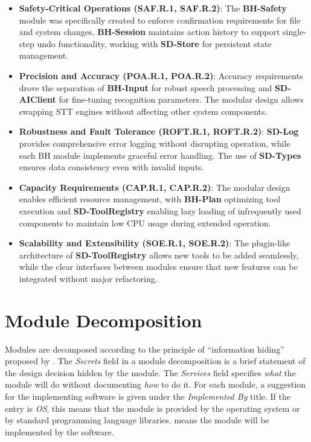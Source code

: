 \documentclass[12pt, titlepage]{article}
\begin{document}
\begin{itemize}
    \item \textbf{Safety-Critical Operations (SAF.R.1, SAF.R.2)}: The
    \textbf{BH-Safety} module was specifically created to enforce confirmation
    requirements for file and system changes. \textbf{BH-Session} maintains
    action history to support single-step undo functionality, working with
    \textbf{SD-Store} for persistent state management.

    \item \textbf{Precision and Accuracy (POA.R.1, POA.R.2)}: Accuracy
    requirements drove the separation of \textbf{BH-Input} for robust speech
    processing and \textbf{SD-AIClient} for fine-tuning recognition parameters.
    The modular design allows swapping STT engines without affecting other
    system components.

    \item \textbf{Robustness and Fault Tolerance (ROFT.R.1, ROFT.R.2)}:
    \textbf{SD-Log} provides comprehensive error logging without disrupting
    operation, while each BH module implements graceful error handling. The use
    of \textbf{SD-Types} ensures data consistency even with invalid inputs.

    \item \textbf{Capacity Requirements (CAP.R.1, CAP.R.2)}: The modular design
    enables efficient resource management, with \textbf{BH-Plan} optimizing tool
    execution and \textbf{SD-ToolRegistry} enabling lazy loading of infrequently
    used components to maintain low CPU usage during extended operation.

    \item \textbf{Scalability and Extensibility (SOE.R.1, SOE.R.2)}: The
    plugin-like architecture of \textbf{SD-ToolRegistry} allows new tools to be
    added seamlessly, while the clear interfaces between modules ensure that
    new features can be integrated without major refactoring.
\end{itemize}

\section{Module Decomposition} \label{SecMD}

Modules are decomposed according to the principle of ``information hiding''
proposed by \citet{ParnasEtAl1984}. The \emph{Secrets} field in a module
decomposition is a brief statement of the design decision hidden by the module.
The \emph{Services} field specifies \emph{what} the module will do without
documenting \emph{how} to do it. For each module, a suggestion for the
implementing software is given under the \emph{Implemented By} title. If the
entry is \emph{OS}, this means that the module is provided by the operating
system or by standard programming language libraries. \emph{\progname{}} means
the module will be implemented by the \progname{} software.
\end{document}
